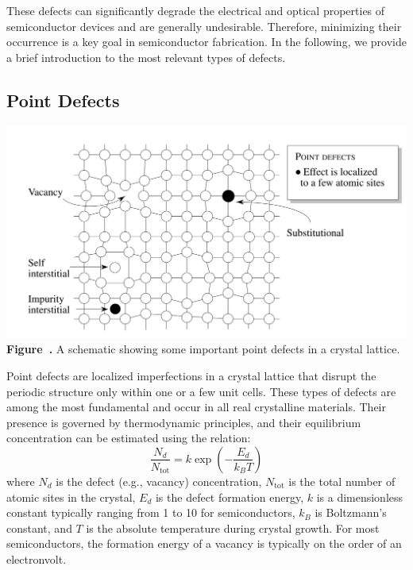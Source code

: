 These defects can significantly degrade the electrical and optical properties of semiconductor devices and are generally undesirable. Therefore, minimizing their occurrence is a key goal in semiconductor fabrication. In the following, we provide a brief introduction to the most relevant types of defects.

\subsection{Point Defects}
\begin{center}
	\begin{minipage}{0.9\textwidth}
		\centering
		\includegraphics[width=\textwidth]{img/point_defects.png}
		\\[0.5em]
		\textbf{Figure~\thefigure.} A schematic showing some important point defects in a crystal lattice.
		\label{fig:fcc_lattice}
	\end{minipage}
\end{center}
Point defects are localized imperfections in a crystal lattice that disrupt the periodic structure only within one or a few unit cells. These types of defects are among the most fundamental and occur in all real crystalline materials. Their presence is governed by thermodynamic principles, and their equilibrium concentration can be estimated using the relation:
\begin{equation*}
	\frac{N_d}{N_\text{tot}} = k \exp\left( -\frac{E_d}{k_B T} \right)
\end{equation*}
where $N_d$ is the defect (e.g., vacancy) concentration, $N_\text{tot}$ is the total number of atomic sites in the crystal, $E_d$ is the defect formation energy, $k$ is a dimensionless constant typically ranging from 1 to 10 for semiconductors, $k_B$ is Boltzmann’s constant, and $T$ is the absolute temperature during crystal growth. For most semiconductors, the formation energy of a vacancy is typically on the order of an electronvolt.

